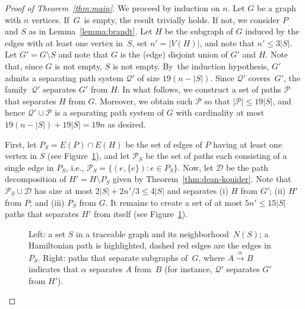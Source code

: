 \documentclass{aic}
\begin{document}
\begin{proof}[Proof of Theorem~\ref{thm:main}]
We proceed by induction on $n$.
Let \(G\) be a graph with \(n\) vertices.
If~\(G\)~is empty, the result trivially holds.
If not, we consider $P$ and $S$ as in Lemma~\ref{lemma:brandt}.
Let \(H\) be the subgraph of \(G\) induced by the edges with at least one vertex in~\(S\),
set \(n' = |V(H)|\),
and note that \(n' \leq 3|S|\).
Let \(G' = G \setminus S\) and note that \(G\) is the (edge) disjoint union of \(G'\) and \(H\).
Note that, since \(G\) is not empty, \(S\) is not empty.
By~the induction hypothesis, \(G'\) admits a separating path system \(\mathcal{Q}'\)
of size \(19(n-|S|)\).
Since \(\mathcal{Q}'\) covers~\(G'\), the family~\(\mathcal{Q}'\) separates  \(G'\) from \(H\).
In what follows, we construct a set of paths \(\mathcal{P}\) that separates
\(H\) from \(G\).
Moreover, we obtain such \(\mathcal{P}\) so that \(|\mathcal{P}| \leq 19|S|\),
and hence \(\mathcal{Q}' \cup \mathcal{P}\)
is a separating path system of \(G\)
with cardinality at most \(19(n-|S|) + 19 |S| = 19n\) as desired.

First, let \(P_S = E(P) \cap E(H)\) be the set of edges of \(P\) having at least one vertex in \(S\) (see Figure~\ref{fig:NS}), and let \(\mathcal{P}_S\) be the set of paths each
consisting of a single edge in \(P_S\), i.e., \(\mathcal{P}_S = \{(e,\{e\}) : e \in P_S\}\).
Now, let \(\mathcal{D}\) be the path decomposition of \(H' = H\setminus P_S\) given by Theorem~\ref{thm:dean-kouider}.
Note that \(\mathcal{P}_S \cup \mathcal{D}\)
has size at most \(2|S| + 2n'/3 \leq 4|S|\) and separates
(i)  \(H\) from \(G'\);
(ii)  \(H'\) from \(P\);
and (iii) \(P_S\) from \(G\).
It remains to create a set of at most \(5n' \leq 15|S|\) paths that separates \(H'\) from itself  (see Figure~\ref{fig:NS}).
\begin{figure}
  \vspace*{-1.5cm}
  \begin{center}
    \hfill
    \begin{minipage}{.48\textwidth}
      
    \end{minipage}
    \hfill
    \begin{minipage}{.48\textwidth}
      \vspace*{1.5cm}
      
    \end{minipage}
    \vspace*{-1.3\baselineskip}
    \caption{Left: a set $S$ in a traceable graph and its neighborhood~$N(S)$;
              a Hamiltonian path is highlighted, dashed red edges are the edges in~$P_S$. Right: paths that separate subgraphs of~$G$, where $A\stackrel{\alpha}{\to}B$ indicates that $\alpha$ separates $A$ from~$B$ (for instance, $\mathcal{Q'}$ separates $G'$ from $H'$).}\label{fig:NS}
  \end{center}
\end{figure}


\end{proof}
\end{document}
